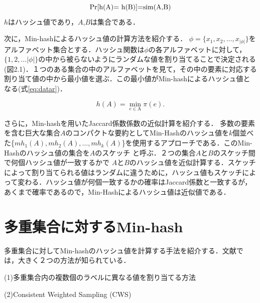 \begin{equation}
$Pr[h(A)= h(B)]=sim(A,B)$
\label{eq:jaccard}
\end{equation}
$h$はハッシュ値であり，$A$,$B$は集合である．

次に，Min-hashによるハッシュ値の計算方法を紹介する．
$\phi=\{x_1,x_2,…,x_{|\phi|}\}$をアルファベット集合とする．ハッシュ関数は$\phi$の各アルファベットに対して，$\{1,2,…|\phi|\}$の中から被らないようにランダムな値を割り当てることで決定される(図2.1)．１つのある集合の中のアルファベットを見て，その中の要素に対応する割り当て値の中から最小値を選ぶ．この最小値がMin-hashによるハッシュ値となる(式\ref{eq:datar})．


\begin{equation}
 \label{eq:datar}
h(A)=\min_{e \in \mbox{A}} \pi(e).
\end{equation}

さらに，Min-hashを用いたJaccard係数係数の近似計算を紹介する．
多数の要素を含む巨大な集合$A$のコンパクトな要約としてMin-Hashのハッシュ値を$k$個並べた\{$mh_1(A),mh_2(A),…,mh_k(A)$\}を使用するアプローチである．このMin-Hashのハッシュ値の集合を$A$のスケッチ \cite{Minhash}と呼ぶ．２つの集合$A$と$B$のスケッチ間で何個ハッシュ値が一致するかで $A $と$B$のハッシュ値を近似計算する．スケッチによって割り当てられる値はランダムに違うために，ハッシュ値もスケッチによって変わる．ハッシュ値が何個一致するかの確率はJaccard係数と一致するが，あくまで確率であるので，Min-Hashによるハッシュ値は近似値である．

\section{多重集合に対するMin-hash}
多重集合に対してMin-hashのハッシュ値を計算する手法を紹介する．文献では，大きく２つの方法が知られている．

(1)多重集合内の複数個のラベルに異なる値を割り当てる方法

(2)Consistent Weighted Sampling (CWS)  \cite{CWS} 

